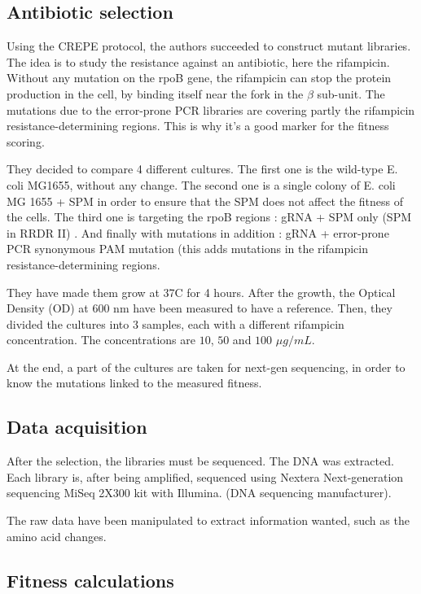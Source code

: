 \documentclass[12pt]{article}
\begin{document}
  \subsection{Antibiotic selection} 

  Using the CREPE protocol, the authors succeeded to construct mutant
  libraries. The idea is to study the resistance against an antibiotic, here
  the rifampicin. Without any mutation on the rpoB gene, the rifampicin can
  stop the protein production in the cell, by binding itself near the fork in
  the $\beta$ sub-unit. The mutations due to the error-prone PCR libraries are
  covering partly the rifampicin resistance-determining regions. This is why
  it's a good marker for the fitness scoring.

  They decided to compare 4 different cultures. The first one is the wild-type
  E. coli MG1655, without any change. The second one is a single colony of E.
  coli MG 1655 + SPM in order to ensure that the SPM does not affect the
  fitness of the cells. The third one is targeting the rpoB regions : gRNA +
  SPM only (SPM in RRDR II) . And finally with mutations in addition : gRNA +
  error-prone PCR synonymous PAM mutation (this adds mutations in the
  rifampicin resistance-determining regions.

  They have made them grow at 37\textdegree C for 4 hours. After the growth,
  the Optical Density (OD) at 600 nm have been measured to have a reference.
  Then, they divided the cultures into 3 samples, each with a different
  rifampicin concentration. The concentrations are $10$, $50$ and $100$ $\mu
  g/mL$.

  At the end, a part of the cultures are taken for next-gen sequencing, in
  order to know the mutations linked to the measured fitness.

  \subsection{Data acquisition} 

  After the selection, the libraries must be sequenced. The DNA was extracted.
  Each library is, after being amplified, sequenced using Nextera
  Next-generation sequencing MiSeq 2X300 kit with Illumina. (DNA sequencing
  manufacturer).

  The raw data have been manipulated to extract information wanted, such as the
  amino acid changes.

  \subsection{Fitness calculations}
\end{document}

